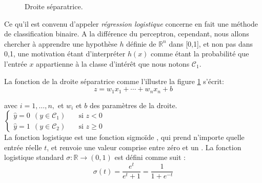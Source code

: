 	\begin{figure}
		\caption{Droite séparatrice.}\label{fig:classification_2case}
	\end{figure}
	Ce qu'il est convenu d'appeler \textit{régression logistique} concerne en fait une méthode de classification binaire. 
	A la différence du perceptron, cependant, nous allons chercher à apprendre une hypothèse $h$ définie de $\mathbb{R}^n$ dans [0,1], et non pas dans {0,1},  une motivation étant d'interpréter $h(x)$ comme étant la probabilité que l'entrée $x$ appartienne à la classe d'intérêt que nous notons $\mathcal{C}_1$. \cite{antoine2018apprentissage}
	
	La fonction de la droite séparatrice comme l'illustre la figure \ref{fig:classification_2case} s'écrit:
	\begin{equation}\label{eq:droite_sep}
	z = w _{1}x_{1}+\cdots +w_{n}x_{n}+b
	\end{equation}
	
	avec $ i=1,\ldots ,n,$ et $w_i$ et $b$ des paramètres de la droite.  %
	\\
	$
	\begin{cases}
	\hat{y}=0 \ \ (y \in \mathcal{C}_1) & \quad \text{si  } z < 0\\
	\hat{y}=1 \ \ (y \in \mathcal{C}_2) & \quad \text{si  } z \geq 0
	\end{cases}
	$\\
	
	La fonction logistique est une fonction sigmoïde , qui prend n'importe quelle entrée réelle $t$, et renvoie une valeur comprise entre zéro et un \cite{ml2008python}. La fonction logistique standard ${\displaystyle \sigma :\mathbb {R} \rightarrow (0,1)}$ est défini comme suit :
	\begin{equation} \label{eq:sigmoid-simple}
	\sigma (t)={\frac {e^{t}}{e^{t}+1}}={\frac {1}{1+e^{-t}}}
	\end{equation}
	

